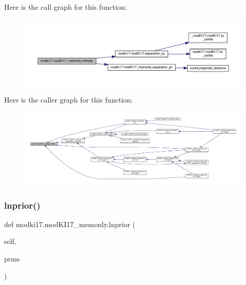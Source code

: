 Here is the call graph for this function\+:\nopagebreak
\begin{figure}[H]
\begin{center}
\leavevmode
\includegraphics[width=350pt]{df/da2/classmodki17_1_1modKI17__memonly_acd5664cdd71217fd6cdd195907ba79a1_cgraph}
\end{center}
\end{figure}
Here is the caller graph for this function\+:\nopagebreak
\begin{figure}[H]
\begin{center}
\leavevmode
\includegraphics[width=350pt]{df/da2/classmodki17_1_1modKI17__memonly_acd5664cdd71217fd6cdd195907ba79a1_icgraph}
\end{center}
\end{figure}
\mbox{\label{classmodki17_1_1modKI17__memonly_abb74996f02269af842ee9a12f8054635}} 
\subsubsection{\texorpdfstring{lnprior()}{lnprior()}}
{\footnotesize\ttfamily def modki17.\+mod\+K\+I17\+\_\+memonly.\+lnprior (\begin{DoxyParamCaption}\item[{}]{self,  }\item[{}]{prms }\end{DoxyParamCaption})}




